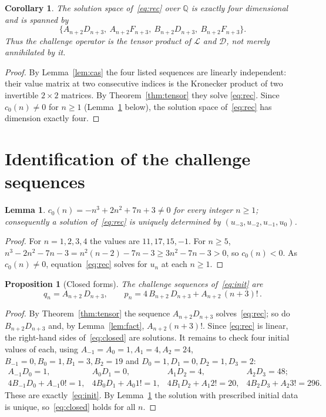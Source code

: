 \documentclass[11pt]{article}
\newtheorem{lemma}[theorem]{Lemma}
\newtheorem{proposition}[theorem]{Proposition}
\newtheorem{corollary}[theorem]{Corollary}
\theoremstyle{remark}
\begin{document}
\begin{corollary}\label{cor:span}
The solution space of~\eqref{eq:rec} over $\mathbb{Q}$ is exactly four
dimensional and is spanned by
\[
\{A_{n+2}D_{n+3},\ A_{n+2}F_{n+3},\ B_{n+2}D_{n+3},\ B_{n+2}F_{n+3}\}.
\]
Thus the challenge operator \emph{is} the tensor product of $\mathcal{L}$
and $\mathcal{D}$, not merely annihilated by it.
\end{corollary}

\begin{proof}
By Lemma~\ref{lem:cas} the four listed sequences are linearly independent: their
value matrix at two consecutive indices is the Kronecker product of two
invertible $2\times2$ matrices. By Theorem~\ref{thm:tensor} they solve
\eqref{eq:rec}. Since $c_0(n)\neq0$ for $n\ge1$ (Lemma~\ref{lem:c0} below), the
solution space of~\eqref{eq:rec} has dimension exactly four.
\end{proof}

\section{Identification of the challenge sequences}

\begin{lemma}\label{lem:c0}
$c_0(n) = -n^3+2n^2+7n+3 \ne 0$ for every integer $n\ge1$; consequently a
solution of~\eqref{eq:rec} is uniquely determined by
$(u_{-3},u_{-2},u_{-1},u_0)$.
\end{lemma}

\begin{proof}
For $n=1,2,3,4$ the values are $11,17,15,-1$. For $n\ge5$,
$n^3 - 2n^2 - 7n - 3 = n^2(n-2) - 7n-3 \ge 3n^2 - 7n - 3 > 0$, so
$c_0(n)<0$. As $c_0(n)\ne0$, equation~\eqref{eq:rec} solves for $u_n$ at each
$n\ge1$.
\end{proof}

\begin{proposition}[Closed forms]\label{prop:closed}
The challenge sequences of~\eqref{eq:init} are
\begin{equation}\label{eq:closed}
q_n = A_{n+2}\,D_{n+3},
\qquad
p_n = 4\,B_{n+2}\,D_{n+3} + A_{n+2}\,(n+3)!\, .
\end{equation}
\end{proposition}

\begin{proof}
By Theorem~\ref{thm:tensor} the sequence $A_{n+2}D_{n+3}$ solves~\eqref{eq:rec};
so do $B_{n+2}D_{n+3}$ and, by Lemma~\ref{lem:fact}, $A_{n+2}(n+3)!$. Since
\eqref{eq:rec} is linear, the right-hand sides of~\eqref{eq:closed} are
solutions. It remains to check four initial values of each, using
$A_{-1}=A_0=1,A_1=4,A_2=24$, $B_{-1}=0,B_0=1,B_1=3,B_2=19$ and
$D_0=1,D_1=0,D_2=1,D_3=2$:
\[
\begin{array}{llll}
A_{-1}D_0 = 1, & A_0D_1 = 0, & A_1D_2 = 4, & A_2D_3 = 48;\\[2pt]
4B_{-1}D_0 + A_{-1}0! = 1, &
4B_0D_1 + A_0 1! = 1, &
4B_1D_2 + A_1 2! = 20, &
4B_2D_3 + A_2 3! = 296.
\end{array}
\]
These are exactly~\eqref{eq:init}. By Lemma~\ref{lem:c0} the solution with
prescribed initial data is unique, so~\eqref{eq:closed} holds for all $n$.
\end{proof}
\end{document}
